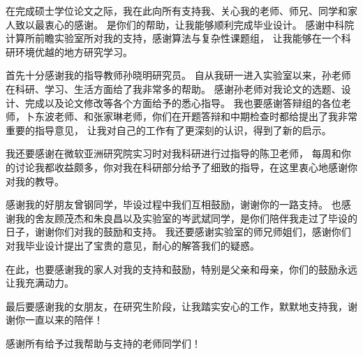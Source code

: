 
\begin{thanks}


在完成硕士学位论文之际，我在此向所有支持我、关心我的老师、师兄、同学和家人致以最衷心的感谢。
是你们的帮助，让我能够顺利完成毕业设计。
感谢中科院计算所前瞻实验室所对我的支持，感谢算法与复杂性课题组，
让我能够在一个科研环境优越的地方研究学习。


首先十分感谢我的指导教师孙晓明研究员。
自从我研一进入实验室以来，孙老师在科研、学习、生活方面给了我非常多的帮助。
感谢孙老师对我论文的选题、设计、完成以及论文修改等各个方面给予的悉心指导。
我也要感谢答辩组的各位老师，卜东波老师、和张家琳老师，你们在开题答辩和中期检查时都给提出了我非常重要的指导意见，
让我对自己的工作有了更深刻的认识，得到了新的启示。

我还要感谢在微软亚洲研究院实习时对我科研进行过指导的陈卫老师，
每周和你的讨论我都收益颇多，你对我在科研部分给予了细致的指导，在这里衷心地感谢你对我的教导。


感谢我的好朋友曾钢同学，毕设过程中我们互相鼓励，谢谢你的一路支持。
也感谢我的舍友顾茂杰和朱良昌以及实验室的岑武斌同学，是你们陪伴我走过了毕设的日子，谢谢你们对我的鼓励和支持。
我还要感谢实验室的师兄师姐们，感谢你们对我毕业设计提出了宝贵的意见，耐心的解答我们的疑惑。

在此，也要感谢我的家人对我的支持和鼓励，特别是父亲和母亲，你们的鼓励永远让我充满动力。

最后要感谢我的女朋友，在研究生阶段，让我踏实安心的工作，默默地支持我，谢谢你一直以来的陪伴！


感谢所有给予过我帮助与支持的老师同学们！


\end{thanks}
